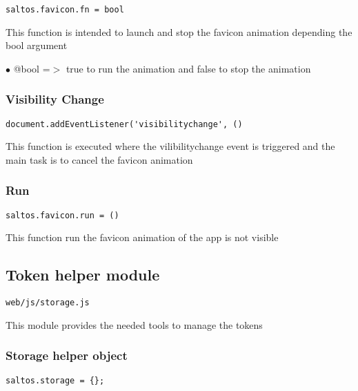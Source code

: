 \documentclass[a4paper]{article}
\begin{document}
\begin{lstlisting}
saltos.favicon.fn = bool
\end{lstlisting}

This function is intended to launch and stop the favicon animation depending
the bool argument

\begin{compactitem}
\item[\color{myblue}$\bullet$] @bool =$>$ true to run the animation and false to stop the animation
\end{compactitem}

\hypertarget{toc842}{}
\subsubsection{Visibility Change}

\begin{lstlisting}
document.addEventListener('visibilitychange', ()
\end{lstlisting}

This function is executed where the vilibilitychange event is triggered and
the main task is to cancel the favicon animation

\hypertarget{toc843}{}
\subsubsection{Run}

\begin{lstlisting}
saltos.favicon.run = ()
\end{lstlisting}

This function run the favicon animation of the app is not visible

\hypertarget{toc844}{}
\subsection{Token helper module}

\begin{lstlisting}
web/js/storage.js
\end{lstlisting}

This module provides the needed tools to manage the tokens

\hypertarget{toc845}{}
\subsubsection{Storage helper object}

\begin{lstlisting}
saltos.storage = {};
\end{lstlisting}
\end{document}

